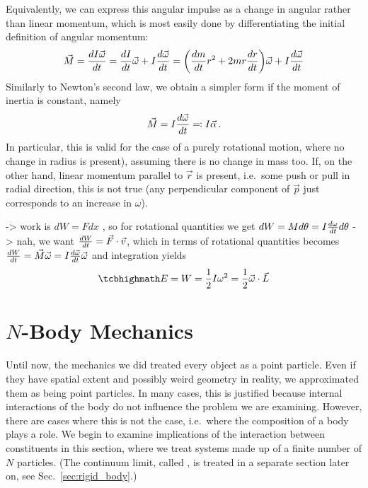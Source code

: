 \documentclass[../class_mech_main.tex]{subfiles}
\begin{document}

Equivalently, we can express this angular impulse as a change in angular rather than linear momentum, which is most easily done by differentiating the initial definition of angular momentum:
\begin{align}
	\vec{M} = \dv{I \vec{\omega}}{t} = \dv{I}{t} \vec{\omega} + I \dv{\vec{\omega}}{t}
	= \qty(\dv{m}{t} r^2 + 2 m r \dv{r}{t}) \vec{\omega} + I \dv{\vec{\omega}}{t}
\end{align}
Similarly to Newton's second law, we obtain a simpler form if the moment of inertia is constant, namely
\begin{equation}
	\vec{M} = I \dv{\vec{\omega}}{t} \eqqcolon I \vec{\alpha} \, .
\end{equation}
In particular, this is valid for the case of a purely rotational motion, where no change in radius is present), assuming there is no change in mass too. If, on the other hand, linear momentum parallel to $\vec{r}$ is present, i.e.~some push or pull in radial direction, this is not true (any perpendicular component of $\vec{p}$ just corresponds to an increase in $\omega$).



-> work is $dW = F dx$ , so for rotational quantities we get $dW = M d\theta = I \dv{\omega}{t} d\theta$  -> nah, we want $\dv{W}{t} = \vec{F} \cdot \vec{v}$, which in terms of rotational quantities becomes $\dv{W}{t} = \vec{M} \vec{\omega} = I \dv{\vec{\omega}}{t} \vec{\omega}$ and integration yields
\begin{equation}
	\eqbox{
		E = W = \frac{1}{2} I \omega^2 = \frac{1}{2} \vec{\omega} \cdot \vec{L}
	}
\end{equation}



	\section{$N$-Body Mechanics}
	\label{sec:n_body_mechanics}
Until now, the mechanics we did treated every object as a point particle. Even if they have spatial extent and possibly weird geometry in reality, we approximated them as being point particles. In many cases, this is justified because internal interactions of the body do not influence the problem we are examining. However, there are cases where this is not the case, i.e.~where the composition of a body plays a role. We begin to examine implications of the interaction between constituents in this section, where we treat systems made up of a finite number of $N$ particles. (The continuum limit, called , is treated in a separate section later on, see Sec.~\ref{sec:rigid_body}.)
\end{document}
